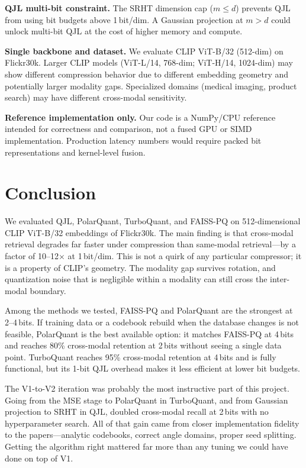 \documentclass[11pt]{article}
\begin{document}
\textbf{QJL multi-bit constraint.} The SRHT dimension cap ($m \leq d$) prevents QJL from using bit
budgets above 1\,bit/dim. A Gaussian projection at $m > d$ could unlock multi-bit QJL at the cost of
higher memory and compute.

\textbf{Single backbone and dataset.} We evaluate CLIP ViT-B/32 (512-dim) on Flickr30k. Larger CLIP
models (ViT-L/14, 768-dim; ViT-H/14, 1024-dim) may show different compression behavior due to different
embedding geometry and potentially larger modality gaps. Specialized domains (medical imaging, product
search) may have different cross-modal sensitivity.

\textbf{Reference implementation only.} Our code is a NumPy/CPU reference intended for correctness and
comparison, not a fused GPU or SIMD implementation. Production latency numbers would require packed bit
representations and kernel-level fusion.

\section{Conclusion}

We evaluated QJL, PolarQuant, TurboQuant, and FAISS-PQ on 512-dimensional CLIP ViT-B/32 embeddings of
Flickr30k. The main finding is that cross-modal retrieval degrades far faster under compression than
same-modal retrieval---by a factor of 10--12$\times$ at 1\,bit/dim. This is not a quirk of any
particular compressor; it is a property of CLIP's geometry. The modality gap survives rotation, and
quantization noise that is negligible within a modality can still cross the inter-modal boundary.

Among the methods we tested, FAISS-PQ and PolarQuant are the strongest at 2--4\,bits. If training data
or a codebook rebuild when the database changes is not feasible, PolarQuant is the best available option:
it matches FAISS-PQ at 4\,bits and reaches 80\% cross-modal retention at 2\,bits without seeing a single
data point. TurboQuant reaches 95\% cross-modal retention at 4\,bits and is fully functional, but its
1-bit QJL overhead makes it less efficient at lower bit budgets.

The V1-to-V2 iteration was probably the most instructive part of this project. Going from the MSE stage
to PolarQuant in TurboQuant, and from Gaussian projection to SRHT in QJL, doubled cross-modal recall at
2\,bits with no hyperparameter search. All of that gain came from closer implementation fidelity to the
papers---analytic codebooks, correct angle domains, proper seed splitting. Getting the algorithm right
mattered far more than any tuning we could have done on top of V1.
\end{document}
